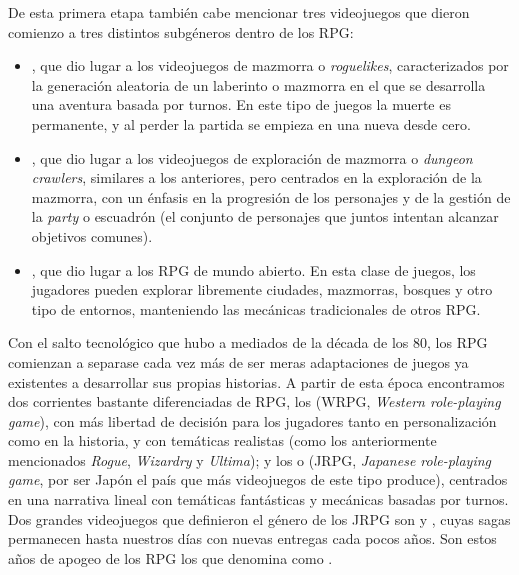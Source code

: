 De esta primera etapa también cabe mencionar tres videojuegos que dieron comienzo a tres distintos subgéneros dentro de los RPG: 
\begin{itemize}
\item {}, que dio lugar a los videojuegos de mazmorra o \textit{roguelikes}, caracterizados por la generación aleatoria de un laberinto o mazmorra en el que se desarrolla una aventura basada por turnos. En este tipo de juegos la muerte es permanente, y al perder la partida se empieza en una nueva desde cero. 
\item {}, que dio lugar a los videojuegos de exploración de mazmorra o \textit{dungeon crawlers}, similares a los anteriores, pero centrados en la exploración de la mazmorra, con un énfasis en la progresión de los personajes y de la gestión de la \textit{party} o escuadrón (el conjunto de personajes que juntos intentan alcanzar objetivos comunes). 
\item {}, que dio lugar a los RPG de mundo abierto. En esta clase de juegos, los jugadores pueden explorar libremente ciudades, mazmorras, bosques y otro tipo de entornos, manteniendo las mecánicas tradicionales de otros RPG. 
\end{itemize}

\medskip

Con el salto tecnológico que hubo a mediados de la década de los 80, los RPG comienzan a separase cada vez más de ser meras adaptaciones de juegos ya existentes a desarrollar sus propias historias. A partir de esta época encontramos dos corrientes bastante diferenciadas de RPG, los  (WRPG, \textit{Western role-playing game}), con más libertad de decisión para los jugadores tanto en personalización como en la historia, y con temáticas realistas (como los anteriormente mencionados \textit{Rogue}, \textit{Wizardry} y \textit{Ultima}); y los  o  (JRPG, \textit{Japanese role-playing game}, por ser Japón el país que más videojuegos de este tipo produce), centrados en una narrativa lineal con temáticas fantásticas y mecánicas basadas por turnos. Dos grandes videojuegos que definieron el género de los JRPG son  y , cuyas sagas permanecen hasta nuestros días con nuevas entregas cada pocos años. Son estos años de apogeo de los RPG los que \citeauthor{barton2008dungeons} denomina como .

\medskip

